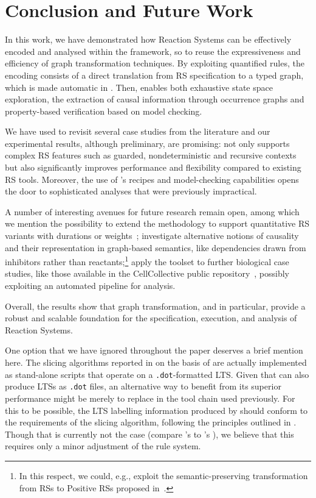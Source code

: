 
\section{Conclusion and Future Work}\label{sec:conc}

In this work, we have demonstrated how Reaction Systems can be effectively encoded and analysed within the \GROOVE framework, so to reuse the expressiveness and efficiency of graph transformation techniques. By exploiting quantified rules, the encoding consists of a direct translation from RS specification to a typed graph, which is made automatic in \BioResolve.
Then, \GROOVE enables both exhaustive state space exploration, the extraction of causal information through occurrence graphs and property-based verification based on model checking.

We have used \GROOVE to revisit several case studies from the literature and our experimental results, although preliminary, are promising: \GROOVE not only supports complex RS features such as guarded, nondeterministic and recursive contexts but also significantly improves performance and flexibility compared to existing RS tools.
Moreover, the use of \GROOVE’s recipes and model-checking capabilities opens the door to sophisticated analyses that were previously impractical.

A number of interesting avenues for future research remain open, among which we mention the possibility to extend the methodology to support quantitative RS variants with durations or weights~\cite{DBLP:journals/nca/BrodoBFGLM23}; investigate alternative notions of causality and their representation in graph-based semantics, like dependencies drawn from inhibitors rather than reactants;\footnote{In this respect, we could, e.g., exploit the semantic-preserving transformation from RSs to Positive RSs proposed in~\cite{DBLP:journals/sttt/BrodoBFGMMP24}.} apply the \GROOVE toolset to further biological case studies, like those available in the CellCollective public repository~\cite{helikar2012cell}, possibly exploiting an automated pipeline for analysis.

Overall, the results show that graph transformation, and \GROOVE in particular, provide a robust and scalable foundation for the specification, execution, and analysis of Reaction Systems.

\medskip\noindent One option that we have ignored throughout the paper deserves a brief mention here. The slicing algorithms reported in \cite{DBLP:conf/cmsb/BowlesBBFGM24,datamod2023} on the basis of \BioResolve are actually implemented as stand-alone scripts that operate on a \texttt{.dot}-formatted LTS. Given that \GROOVE can also produce LTSs as \texttt{.dot} files, an alternative way to benefit from its superior performance might be merely to replace \BioResolve in the tool chain used previously. For this to be possible, the LTS labelling information produced by \GROOVE should conform to the requirements of the slicing algorithm, following the principles outlined in . Though that is currently not the case (compare \GROOVE's  to \BioResolve's ), we believe that this requires only a minor adjustment of the rule system.


